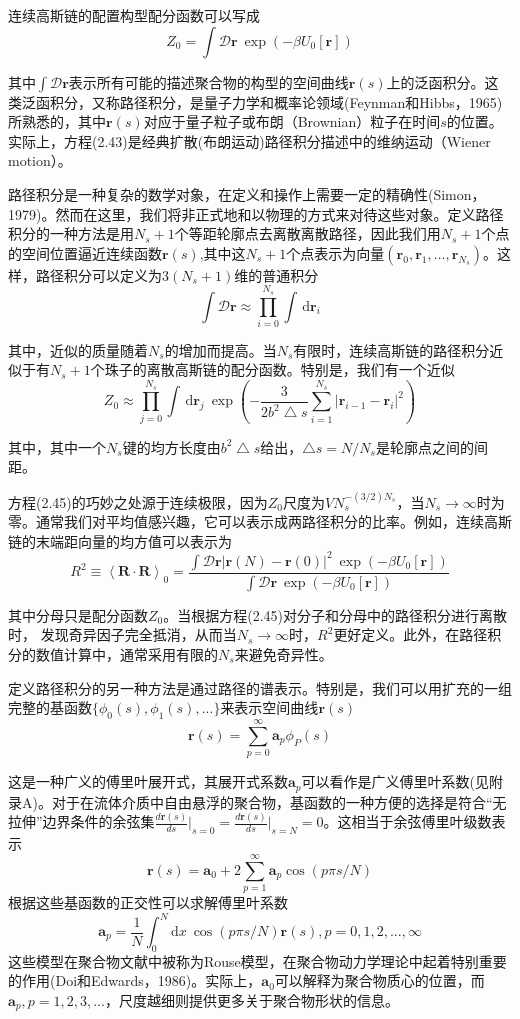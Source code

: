 \documentclass{article}
\begin{document}
连续高斯链的配置构型配分函数可以写成
$$Z_0=\int \mathcal{D}\mathbf{r}~\exp(-\beta U_0[\mathbf{r}])$$

其中$\int \mathcal{D}\mathbf{r}$表示所有可能的描述聚合物的构型的空间曲线$\mathbf{r}(s)$上的泛函积分。这类泛函积分，又称路径积分，是量子力学和概率论领域(Feynman和Hibbs，1965)所熟悉的，其中$\mathbf{r}(s)$对应于量子粒子或布朗（Brownian）粒子在时间$s$的位置。实际上，方程(2.43)是经典扩散(布朗运动)路径积分描述中的维纳运动（Wiener motion）。

路径积分是一种复杂的数学对象，在定义和操作上需要一定的精确性(Simon，1979)。然而在这里，我们将非正式地和以物理的方式来对待这些对象。定义路径积分的一种方法是用$N_s+1$个等距轮廓点去离散离散路径，因此我们用$N_s+1$个点的空间位置逼近连续函数$\mathbf{r}(s)$,其中这$N_s+1$个点表示为向量$(\mathbf{r}_0,\mathbf{r}_1,...,\mathbf{r}_{N_s})$。这样，路径积分可以定义为$3(N_s+1)$维的普通积分
$$\int \mathcal{D}\mathbf{r}\approx \prod_{i=0}^{N_s} \int \, \mathrm{d} \mathbf{r}_i$$

其中，近似的质量随着$N_s$的增加而提高。当$N_s$有限时，连续高斯链的路径积分近似于有$N_s+1$个珠子的离散高斯链的配分函数。特别是，我们有一个近似
$$Z_0\approx \prod_{j=0}^{N_s} \int \, \mathrm{d} \mathbf{r}_j~\exp \left( -\frac{3}{2b^2\bigtriangleup s}\sum_{i=1}^{N_s}\left|\mathbf{r}_{i-1}-\mathbf{r}_i \right|^2 \right)$$

其中，其中一个$N_s$键的均方长度由$b^2\bigtriangleup s$给出，$\bigtriangleup s=N/N_s$是轮廓点之间的间距。

方程(2.45)的巧妙之处源于连续极限，因为$Z_0$尺度为$VN_s^{−(3/2)N_s}$，当$N_s\rightarrow \infty$时为零。通常我们对平均值感兴趣，它可以表示成两路径积分的比率。例如，连续高斯链的末端距向量的均方值可以表示为
$$R^2\equiv \left \langle \mathbf{R}\cdot \mathbf{R}\right \rangle _0=\frac{\int \mathcal{D}\mathbf{r}\left| \mathbf{r}(N)-\mathbf{r}(0) \right|^2~\exp(-\beta U_0[\mathbf{r}])}{\int \mathcal{D}\mathbf{r}~\exp(-\beta U_0[\mathbf{r}])}$$

其中分母只是配分函数$Z_0$。当根据方程(2.45)对分子和分母中的路径积分进行离散时，
发现奇异因子完全抵消，从而当$N_s\rightarrow \infty$时，$R^2$更好定义。此外，在路径积分的数值计算中，通常采用有限的$N_s$来避免奇异性。

定义路径积分的另一种方法是通过路径的谱表示。特别是，我们可以用扩充的一组完整的基函数$\lbrace \phi _0(s),\phi _1(s),... \rbrace$来表示空间曲线$\mathbf{r}(s)$
$$\mathbf{r}(s)=\sum_{p=0}^{\infty} \mathbf{a}_p \phi _P(s)$$

这是一种广义的傅里叶展开式，其展开式系数$\mathbf{a}_p$可以看作是广义傅里叶系数(见附录A)。对于在流体介质中自由悬浮的聚合物，基函数的一种方便的选择是符合“无拉伸”边界条件的余弦集$\frac{d\mathbf{r}(s)}{ds}\vert _{s=0}=\frac{d\mathbf{r}(s)}{ds}\vert _{s=N}=0$。这相当于余弦傅里叶级数表示
$$\mathbf{r}(s)=\mathbf{a}_0+2\sum_{p=1}^{\infty} \mathbf{a}_p \cos(p\pi s/N)$$
根据这些基函数的正交性可以求解傅里叶系数
$$\mathbf{a}_p=\frac{1}{N}\int_{0}^{N}  \mathrm{d}x~\cos(p\pi s/N)\mathbf{r}(s),p=0,1,2,...,\infty$$
这些模型在聚合物文献中被称为Rouse模型，在聚合物动力学理论中起着特别重要的作用(Doi和Edwards，1986)。实际上，$\mathbf{a}_0$可以解释为聚合物质心的位置，而$\mathbf{a}_p,p=1,2,3,...$，尺度越细则提供更多关于聚合物形状的信息。
\end{document}
